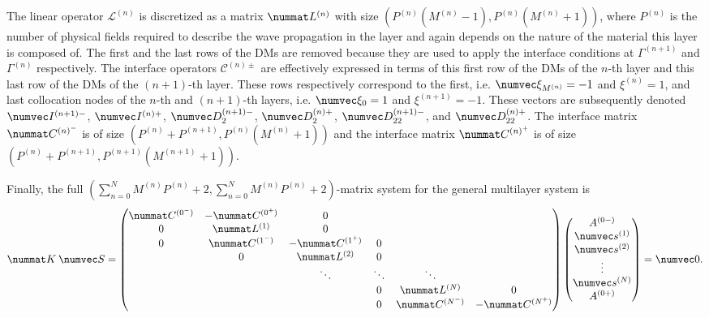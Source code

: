The linear operator $\mathcal L^{(n)}$ is discretized as a matrix $\nummat L^{(n)}$ with size $(P^{(n)} (M^{(n)} - 1), P^{(n)} (M^{(n)} + 1))$, where $P^{(n)}$ is the number of physical fields required to describe the wave propagation in the layer and again depends on the nature of the material this layer is composed of. The first and the last rows of the DMs are removed because they are used to apply the interface conditions at $\Gamma^{(n+1)}$ and $\Gamma^{(n)}$ respectively. The interface operators $\mathcal C^{(n)\pm}$ are effectively expressed in terms of this first row of the DMs of the $n$-th layer and this last row of the DMs of the $(n+1)$-th layer. These rows respectively correspond to the first, i.e. $\numvec\xi_{M^{(n)}}=-1$ and $\xi^{(n)}=1$, and last collocation nodes of the $n$-th and $(n+1)$-th layers, i.e. $\numvec\xi_0=1$ and $\xi^{(n+1)}=-1$.  These vectors are subsequently denoted $\numvec I^{(n+1)-}$, $\numvec I^{(n)+}$, $\numvec D_{2}^{(n+1)-}$, $\numvec D_{2}^{(n)+}$, $\numvec D_{22}^{(n+1)-}$, and $\numvec D_{22}^{(n)+}$. The interface matrix $\nummat C^{(n)^-}$ is of size $(P^{(n)}+P^{(n+1)},P^{(n)}(M^{(n)}+1))$ and the interface matrix $\nummat C^{(n)^+}$ is of size $(P^{(n)}+P^{(n+1)},P^{(n+1)}(M^{(n+1)}+1))$.
    
Finally, the full $(\sum_{n=0}^N M^{(n)} P^{(n)} + 2,\sum_{n=0}^N M^{(n)} P^{(n)} + 2)$-matrix  system for the general multilayer system is
    \begin{equation} \nummat K \: \numvec S = 
        \begin{pmatrix}
            \nummat C^{(0^-)} & -\nummat C^{(0^+)} & 0 & \\
            0 & \nummat L^{(1)} & 0 &  \\
            0 & \nummat C^{(1^-)} & -\nummat C^{(1^+)} & 0   & \\
            & 0 & \nummat L^{(2)}  & 0  & \\
            & & \ddots & \ddots & \ddots \\
            & & & 0 & \nummat L^{(N)}  & 0 \\
            & & & 0 & \nummat C^{(N^-)} & -\nummat C^{({N}^+)}
        \end{pmatrix}
        \begin{pmatrix}
                A^{(0-)} \\ \numvec s^{(1)} \\ \numvec s^{(2)} \\ \vdots \\ \numvec s^{(N)} \\ A^{({0+})} 
        \end{pmatrix} = \numvec 0.
        \label{eq:discretized_multilayer_system}
    \end{equation}
    
